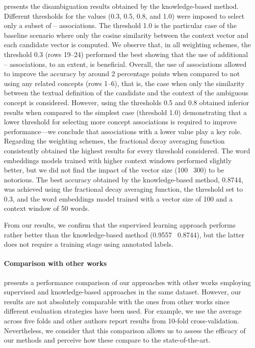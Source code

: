  presents the disambiguation results obtained by the knowledge-based method.
Different thresholds for the  values (0.3, 0.5, 0.8, and 1.0) were imposed to select only a subset of -- associations.
The threshold 1.0 is the particular case of the baseline scenario where only the cosine similarity between the context vector and each candidate  vector is computed.
We observe that, in all weighting schemes, the threshold 0.3 (rows 19--24) performed the best showing that the use of additional -- associations, to an extent, is beneficial.
Overall, the use of associations allowed to improve the accuracy by around 2 percentage points when compared to not using any related concepts (rows 1--6), that is, the case when only the similarity between the textual definition of the candidate  and the context of the ambiguous concept is considered.
However, using the  thresholds 0.5 and 0.8 obtained inferior results when compared to the simplest case (threshold 1.0) demonstrating that a lower  threshold for selecting more concept associations is required to improve performance---we conclude that associations with a lower value play a key role.
Regarding the weighting schemes, the fractional decay averaging function consistently obtained the highest results for every  threshold considered.
The word embeddings models trained with higher context windows performed slightly better, but we did not find the impact of the vector size (100 \vs\ 300) to be notorious.
The best accuracy obtained by the knowledge-based method, 0.8744, was achieved using the fractional decay averaging function, the  threshold set to 0.3, and the word embeddings model trained with a vector size of 100 and a context window of 50 words.

From our results, we confirm that the supervised learning approach performs rather better than the knowledge-based method (0.9557 \vs\ 0.8744), but the latter does not require a training stage using annotated labels.




\paragraph{Comparison with other works}

 presents a performance comparison of our approaches with other works employing supervised and knowledge-based approaches in the same dataset.
However, our results are not absolutely comparable with the ones from other works since different evaluation strategies have been used.
For example, we use the average across five folds and other authors report results from 10-fold cross-validation.
Nevertheless, we consider that this comparison allows us to assess the efficacy of our methods and perceive how these compare to the state-of-the-art.

